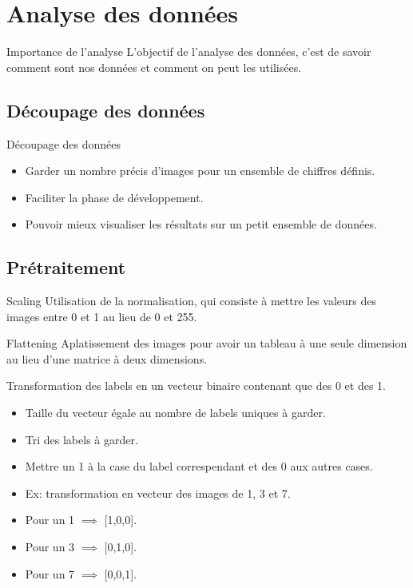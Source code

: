 \documentclass[10pt,handout]{beamer}
\begin{document}
\section{Analyse des données}
\begin{frame}
    \begin{block}{Importance de l'analyse}
        L'objectif de l'analyse des données, c'est de savoir comment sont nos données et comment on peut les utilisées.
    \end{block}
\end{frame}
 

\subsection{Découpage des données}

\begin{frame}{Découpage des données}
    \begin{itemize}
        \item Garder un nombre précis d’images pour un ensemble de chiffres définis.
        \item Faciliter la phase de développement.
        \item Pouvoir mieux visualiser les résultats sur un petit
        ensemble de données.
    \end{itemize}
\end{frame}

\subsection{Prétraitement}

\begin{frame}
\begin{block}{Scaling}
    Utilisation de la normalisation, qui consiste à
    mettre les valeurs des images entre 0 et 1 au lieu de 0 et 255.
\end{block}
\begin{block}{Flattening}
    Aplatissement des images pour avoir un tableau à une seule dimension au lieu d’une matrice à deux dimensions.
\end{block}
\begin{block}{}
    Transformation des labels en un vecteur binaire contenant que des 0 et des 1.
    \begin{itemize}
        \item Taille du vecteur égale au nombre de labels uniques à garder.
        \item Tri des labels à garder.
        \item Mettre un 1 à la case du label correspendant
        et des 0 aux autres cases.
        \item Ex: transformation en vecteur des images de 1, 3 et 7.
        \item Pour un 1 $\implies$ [1,0,0].
        \item Pour un 3 $\implies$ [0,1,0].
        \item Pour un 7 $\implies$ [0,0,1].
    \end{itemize}
\end{block}
\end{frame}
\end{document}
